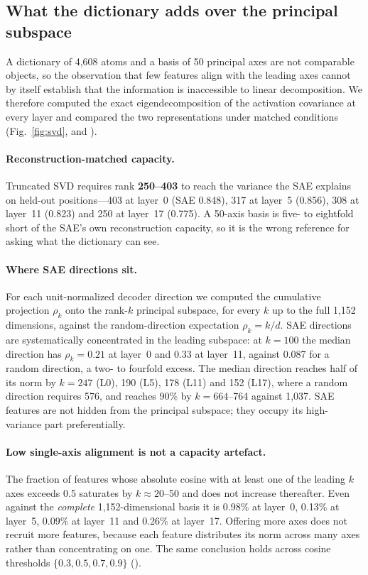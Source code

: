 \subsection*{What the dictionary adds over the principal subspace}
\label{sec:svd}

A dictionary of 4,608 atoms and a basis of 50 principal axes are not comparable objects, so the
observation that few features align with the leading axes cannot by itself establish that the
information is inaccessible to linear decomposition. We therefore computed the exact
eigendecomposition of the activation covariance at every layer and compared the two representations
under matched conditions (Fig.~\ref{fig:svd},  and ).

\paragraph{Reconstruction-matched capacity.} Truncated SVD requires rank \textbf{250--403} to reach
the variance the SAE explains on held-out positions---403 at layer~0 (SAE 0.848), 317 at layer~5
(0.856), 308 at layer~11 (0.823) and 250 at layer~17 (0.775). A 50-axis basis is five- to eightfold
short of the SAE's own reconstruction capacity, so it is the wrong reference for asking what the
dictionary can see.

\paragraph{Where SAE directions sit.} For each unit-normalized decoder direction we computed the
cumulative projection $\rho_k$ onto the rank-$k$ principal subspace, for every $k$ up to the full
1,152 dimensions, against the random-direction expectation $\rho_k = k/d$. SAE directions are
systematically concentrated in the leading subspace: at $k{=}100$ the median direction has
$\rho_k = 0.21$ at layer~0 and 0.33 at layer~11, against 0.087 for a random direction, a two- to
fourfold excess. The median direction reaches half of its norm by $k = 247$ (L0), 190 (L5), 178
(L11) and 152 (L17), where a random direction requires 576, and reaches 90\% by $k = 664$--764
against 1,037. SAE features are not hidden from the principal subspace; they occupy its
high-variance part preferentially.

\paragraph{Low single-axis alignment is not a capacity artefact.} The fraction of features whose
absolute cosine with at least one of the leading $k$ axes exceeds 0.5 saturates by $k \approx
20$--50 and does not increase thereafter. Even against the \emph{complete} 1,152-dimensional basis
it is 0.98\% at layer~0, 0.13\% at layer~5, 0.09\% at layer~11 and 0.26\% at layer~17. Offering more
axes does not recruit more features, because each feature distributes its norm across many axes
rather than concentrating on one. The same conclusion holds across cosine thresholds
$\{0.3, 0.5, 0.7, 0.9\}$ ().

